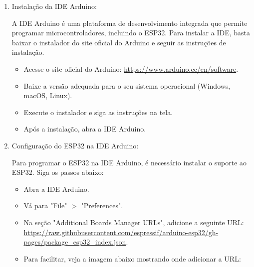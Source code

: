 \documentclass[a4paper]{article}
\begin{document}
    \begin{answer}
        \begin{enumerate}
            \item  Instalação da IDE Arduino:

                A IDE Arduino é uma plataforma de desenvolvimento integrada que permite
                programar microcontroladores, incluindo o ESP32. Para instalar a IDE,
                basta baixar o instalador do site oficial do Arduino e seguir as instruções
                de instalação.

                \begin{itemize}
                    \item  Acesse o site oficial do Arduino: \url{https://www.arduino.cc/en/software}.
                    \item  Baixe a versão adequada para o seu sistema operacional (Windows, macOS, Linux).
                    \item  Execute o instalador e siga as instruções na tela.
                    \item  Após a instalação, abra a IDE Arduino.
                \end{itemize}
            \item Configuração do ESP32 na IDE Arduino:
            
                Para programar o ESP32 na IDE Arduino, é necessário instalar o suporte
                ao ESP32. Siga os passos abaixo:

                \begin{itemize}
                    \item  Abra a IDE Arduino.
                    \item  Vá para "File" $>$ "Preferences".
                    \item  Na seção "Additional Boards Manager URLs", adicione a seguinte  URL:
                        \url{https://raw.githubusercontent.com/espressif/arduino-esp32/gh-pages/package_esp32_index.json}.
                    \item  Para facilitar, veja a imagem abaixo mostrando onde adicionar a URL:


\end{itemize}
\end{enumerate}
\end{answer}
\end{document}
